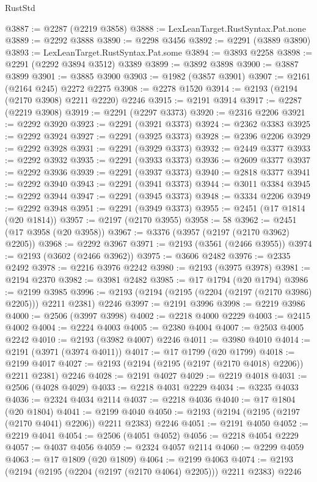 \begin{lexlean}{RustStd}
\begin{coremodule}
{\begin{coremodule}
{{{{{{{{{{{{{{{{{{{{{{{{{{@3887 := @2287 (@2219 @3858)
@3888 := LexLeanTarget.RustSyntax.Pat.none
@3889 := @2292 @3888
@3890 := @2298 @3456
@3892 := @2291 (@3889 @3890)
@3893 := LexLeanTarget.RustSyntax.Pat.some
@3894 := @3893 @2258
@3898 := @2291 (@2292 @3894 @3512) @3389
@3899 := @3892 @3898
@3900 := @3887 @3899
@3901 := @3885 @3900
@3903 := @1982 (@3857 @3901)
@3907 := @2161 (@2164 @245) @2272 @2275
@3908 := @2278 @1520
@3914 := @2193 (@2194 (@2170 @3908) @2211 @2220) @2246
@3915 := @2191 @3914
@3917 := @2287 (@2219 @3908)
@3919 := @2291 (@2297 @3373)
@3920 := @2316 @2206
@3921 := @2292 @3920
@3923 := @2291 (@3921 @3373)
@3924 := @2362 @3383
@3925 := @2292 @3924
@3927 := @2291 (@3925 @3373)
@3928 := @2396 @2206
@3929 := @2292 @3928
@3931 := @2291 (@3929 @3373)
@3932 := @2449 @3377
@3933 := @2292 @3932
@3935 := @2291 (@3933 @3373)
@3936 := @2609 @3377
@3937 := @2292 @3936
@3939 := @2291 (@3937 @3373)
@3940 := @2818 @3377
@3941 := @2292 @3940
@3943 := @2291 (@3941 @3373)
@3944 := @3011 @3384
@3945 := @2292 @3944
@3947 := @2291 (@3945 @3373)
@3948 := @3334 @2206
@3949 := @2292 @3948
@3951 := @2291 (@3949 @3373)
@3955 := @2451 (@17 @1814 (@20 @1814))
@3957 := @2197 (@2170 @3955)
@3958 := 58
@3962 := @2451 (@17 @3958 (@20 @3958))
@3967 := @3376 (@3957 (@2197 (@2170 @3962) @2205))
@3968 := @2292 @3967
@3971 := @2193 (@3561 (@2466 @3955))
@3974 := @2193 (@3602 (@2466 @3962))
@3975 := @3606 @2482
@3976 := @2335 @2492
@3978 := @2216 @3976 @2242
@3980 := @2193 (@3975 @3978)
@3981 := @2194 @2370
@3982 := @3981 @2482
@3985 := @17 @1794 (@20 @1794)
@3986 := @2199 @3985
@3996 := @2193 (@2194 (@2195 (@2204 (@2197 (@2170 @3986) @2205))) @2211 @2381) @2246
@3997 := @2191 @3996
@3998 := @2219 @3986
@4000 := @2506 (@3997 @3998)
@4002 := @2218 @4000 @2229
@4003 := @2415 @4002
@4004 := @2224 @4003
@4005 := @2380 @4004
@4007 := @2503 @4005 @2242
@4010 := @2193 (@3982 @4007) @2246
@4011 := @3980 @4010
@4014 := @2191 (@3971 (@3974 @4011))
@4017 := @17 @1799 (@20 @1799)
@4018 := @2199 @4017
@4027 := @2193 (@2194 (@2195 (@2197 (@2170 @4018) @2206)) @2211 @2381) @2246
@4028 := @2191 @4027
@4029 := @2219 @4018
@4031 := @2506 (@4028 @4029)
@4033 := @2218 @4031 @2229
@4034 := @3235 @4033
@4036 := @2324 @4034 @2114
@4037 := @2218 @4036
@4040 := @17 @1804 (@20 @1804)
@4041 := @2199 @4040
@4050 := @2193 (@2194 (@2195 (@2197 (@2170 @4041) @2206)) @2211 @2383) @2246
@4051 := @2191 @4050
@4052 := @2219 @4041
@4054 := @2506 (@4051 @4052)
@4056 := @2218 @4054 @2229
@4057 := @4037 @4056
@4059 := @2324 @4057 @2114
@4060 := @2299 @4059
@4063 := @17 @1809 (@20 @1809)
@4064 := @2199 @4063
@4074 := @2193 (@2194 (@2195 (@2204 (@2197 (@2170 @4064) @2205))) @2211 @2383) @2246
}}}}}}}}}}}}}}}}}}}}}}}}}}
\end{coremodule}}
\end{coremodule}
\end{lexlean}
